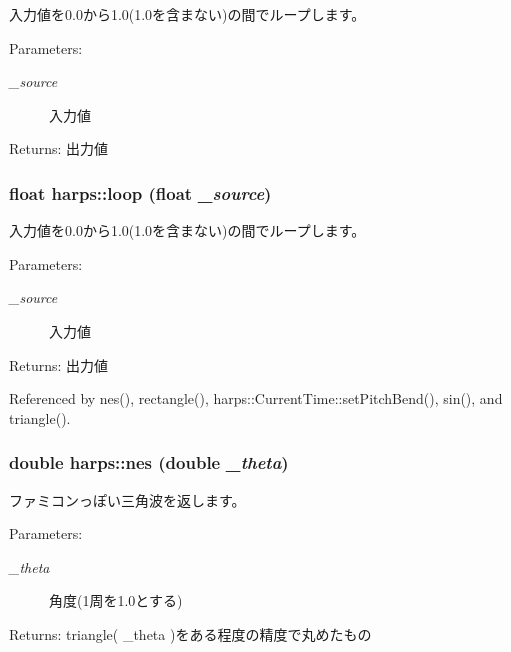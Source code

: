 入力値を0.0から1.0(1.0を含まない)の間でループします。 \begin{Desc}
\item[Parameters:]
\begin{description}
\item[{\em \_\-source}]入力値 \end{description}
\end{Desc}
\begin{Desc}
\item[Returns:]出力値 \end{Desc}
\subsubsection[loop]{\setlength{\rightskip}{0pt plus 5cm}float harps::loop (float {\em \_\-source})\hspace{0.3cm}{\tt  [inline]}}\label{namespaceharps_87cb95178359fc94fd9cf4b8c6bcefff}


入力値を0.0から1.0(1.0を含まない)の間でループします。 \begin{Desc}
\item[Parameters:]
\begin{description}
\item[{\em \_\-source}]入力値 \end{description}
\end{Desc}
\begin{Desc}
\item[Returns:]出力値 \end{Desc}


Referenced by nes(), rectangle(), harps::CurrentTime::setPitchBend(), sin(), and triangle().
\subsubsection[nes]{\setlength{\rightskip}{0pt plus 5cm}double harps::nes (double {\em \_\-theta})\hspace{0.3cm}{\tt  [inline]}}\label{namespaceharps_bebd9a61b530b183652b2d08e2e8ee23}


ファミコンっぽい三角波を返します。 \begin{Desc}
\item[Parameters:]
\begin{description}
\item[{\em \_\-theta}]角度(1周を1.0とする) \end{description}
\end{Desc}
\begin{Desc}
\item[Returns:]triangle( \_\-theta )をある程度の精度で丸めたもの \end{Desc}


